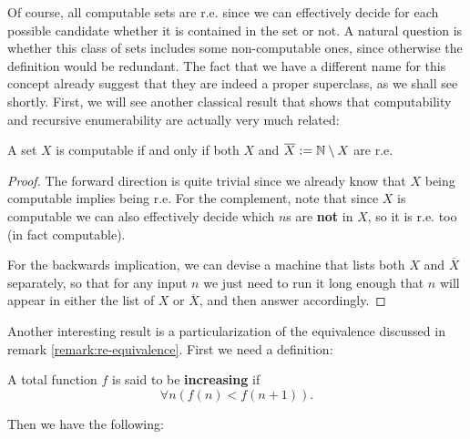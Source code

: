 \documentclass[../main.tex]{memoir}
\begin{document}
Of course, all computable sets are r.e. since we can effectively decide for each possible candidate whether it is contained in the set or not. A natural question is whether this class of sets includes some non-computable ones, since otherwise the definition would be redundant. The fact that we have a different name for this concept already suggest that they are indeed a proper superclass, as we shall see shortly. First, we will see another classical result that shows that computability and recursive enumerability are actually very much related:

\begin{theorem}
  \label{thm:complementation}
  A set $X$ is computable if and only if both $X$ and $\overline{X} := \mathbb{N} \setminus X$ are r.e.
\end{theorem}
\begin{proof}
  The forward direction is quite trivial since we already know that $X$ being computable implies being r.e. For the complement, note that since $X$ is computable we can also effectively decide which $n$s are \textbf{not} in $X$, so it is r.e. too (in fact computable).

  For the backwards implication, we can devise a machine that lists both $X$ and $\overline{X}$ separately, so that for any input $n$ we just need to run it long enough that $n$ will appear in either the list of $X$ or $\overline{X}$, and then answer accordingly.
\end{proof}

Another interesting result is a particularization of the equivalence discussed in remark \ref{remark:re-equivalence}. First we need a definition:

\begin{definition}
  A total function $f$ is said to be \textbf{increasing} if
  \[ \forall n (f(n) < f(n + 1)). \]
\end{definition}

Then we have the following:
\end{document}
